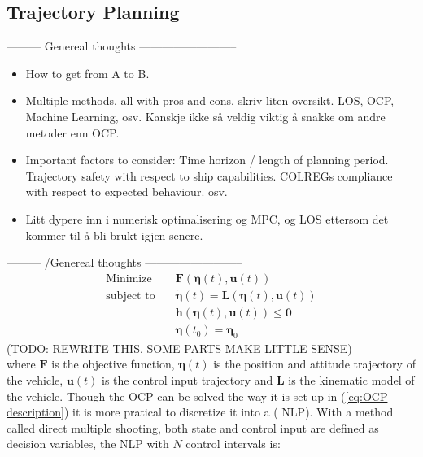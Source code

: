 \subsection{Trajectory Planning}
--------- Genereal thoughts --------------------------
\begin{itemize}
    \item How to get from A to B.
    \item Multiple methods, all with pros and cons, skriv liten oversikt.
    \subitem LOS, OCP, Machine Learning, osv.
    \subitem Kanskje ikke så veldig viktig å snakke om andre metoder enn OCP.  
    \item Important factors to consider:
    \subitem Time horizon / length of planning period.
    \subitem Trajectory safety with respect to ship capabilities.
    \subitem \gls{COLREGs} compliance with respect to expected behaviour.
    \subitem osv.
    \item Litt dypere inn i numerisk optimalisering og MPC, og LOS ettersom det kommer til å bli brukt igjen senere.
\end{itemize}
--------- /Genereal thoughts --------------------------
\begin{subequations}
    \label{eq:OCP description}
\begin{align}
    \textrm{Minimize} \quad & \textbf{F}(\boldsymbol{\eta}(t), \textbf{u}(t)) \label{eq:OCP-a} \\ 
    \textrm{subject to} \quad & \dot{\boldsymbol{\eta}}(t) = \textbf{L}(\boldsymbol{\eta}(t), \textbf{u}(t)) \label{eq:OCP-b} \\
    \quad & \textbf{h}(\boldsymbol{\eta}(t), \textbf{u}(t)) \leq \textbf{0} \label{eq:OCP-c}\\
    \quad & \boldsymbol{\eta}(t_0) = \boldsymbol{\eta}_0 \label{eq:OCP-d}
\end{align}
\end{subequations}
(TODO: REWRITE THIS, SOME PARTS MAKE LITTLE SENSE)\\
where $\textbf{F}$ is the objective function, $\boldsymbol{\eta}(t)$ is the position and attitude trajectory of the vehicle, $\textbf{u}(t)$
is the control input trajectory and $\textbf{L}$ is the kinematic model of the vehicle. Though the OCP can be solved
the way it is set up in (\ref{eq:OCP description}) it is more pratical to discretize it into a ( \gls{NLP}).
With a method called direct multiple shooting, both state and control input are defined as decision variables, the  \gls{NLP} with
$N$ control intervals is:

